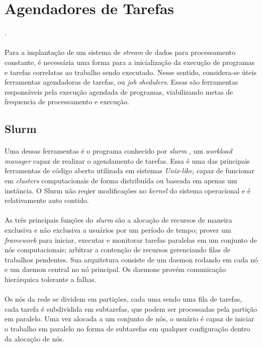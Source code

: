 \section{Agendadores de Tarefas}.


\paragraph{}Para a implantação de um sistema de \textit{stream} de dados para processamento constante, é necessária uma forma para a inicialização da execução de programas e tarefas correlatas ao trabalho sendo executado. Nesse sentido, considera-se úteis ferramentas agendadoras de tarefas, ou \textit{job shedulers}. Essas são ferramentas responsáveis pela execução agendada de programas, viabilizando metas de frequencia de processamento e execução.

\subsection{Slurm}

\paragraph{}Uma dessas ferramentas é o programa conhecido por \textit{slurm} \cite{Slurm}, um \textit{workload manager} capaz de realizar o agendamento de tarefas. Essa é uma das principais ferramentas de código aberto utilizada em sistemas \textit{Unix-like}, capaz de funcionar em \textit{clusters} computacionais de forma distribuída ou baseada em apenas um instância. O Slurm não reqier modificações no \textit{kernel} do sistema operacional e é relativamente auto contido.

\paragraph{}As três principais funções do \textit{slurm} são a alocação de recursos de maneira exclusiva e não exclusiva a usuários por um período de tempo; prover um \textit{framework} para iniciar, executar e monitorar tarefas paralelas em um conjunto de nós computacionais; arbitrar a contenção de recursos gerenciando filas de trabalhos pendentes. Sua arquitetura consiste de um daemon rodando em cada nó e um daemon central no nó principal. Os daemons provém comunicação hierárquica tolerante a falhas.

\paragraph{}Os nós da rede se dividem em partições, cada uma sendo uma fila de tarefas, cada tarefa é subdividida em subtarefas, que podem ser processadas pela partição em paralelo. Uma vez alocada a um conjunto de nós, o usuário é capaz de iniciar o trabalho em paralelo no forma de subtarefas em qualquer configuração dentro da alocação de nós.


